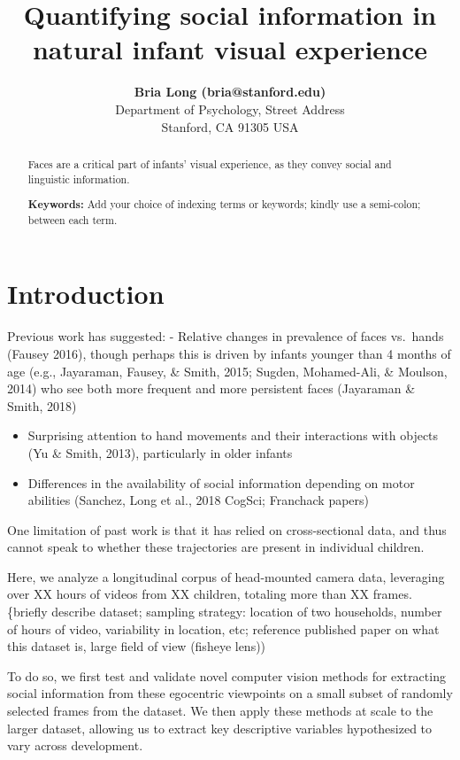 \documentclass[10pt, letterpaper]{article}
\title{Quantifying social information in natural infant visual experience}
\author{{\large \bf Bria Long (bria@stanford.edu)}  \AND {\large \bf George Kachergis (kachergis@stanford.edu)}  \AND {\large \bf Ketan Jay Agarwal (agrawalk@stanford.edu)}  \AND {\large \bf Michael C. Frank (mcfrank@stanford.edu)} \\ Department of Psychology, Street Address \\ Stanford, CA 91305 USA}
\begin{document}
\maketitle

\begin{abstract}
Faces are a critical part of infants' visual experience, as they convey
social and linguistic information.

\textbf{Keywords:}
Add your choice of indexing terms or keywords; kindly use a semi-colon;
between each term.
\end{abstract}

\hypertarget{introduction}{%
\section{Introduction}\label{introduction}}

Previous work has suggested: - Relative changes in prevalence of faces
vs.~hands (Fausey 2016), though perhaps this is driven by infants
younger than 4 months of age (e.g., Jayaraman, Fausey, \& Smith, 2015;
Sugden, Mohamed-Ali, \& Moulson, 2014) who see both more frequent and
more persistent faces (Jayaraman \& Smith, 2018)

\begin{itemize}
\item
  Surprising attention to hand movements and their interactions with
  objects (Yu \& Smith, 2013), particularly in older infants
\item
  Differences in the availability of social information depending on
  motor abilities (Sanchez, Long et al., 2018 CogSci; Franchack papers)
\end{itemize}

One limitation of past work is that it has relied on cross-sectional
data, and thus cannot speak to whether these trajectories are present in
individual children.

Here, we analyze a longitudinal corpus of head-mounted camera data,
leveraging over XX hours of videos from XX children, totaling more than
XX frames. \{briefly describe dataset; sampling strategy: location of
two households, number of hours of video, variability in location, etc;
reference published paper on what this dataset is, large field of view
(fisheye lens))

To do so, we first test and validate novel computer vision methods for
extracting social information from these egocentric viewpoints on a
small subset of randomly selected frames from the dataset. We then apply
these methods at scale to the larger dataset, allowing us to extract key
descriptive variables hypothesized to vary across development.
\end{document}
